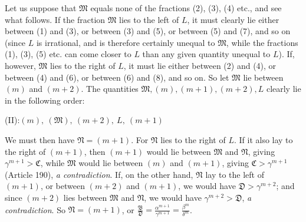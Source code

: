 Let us suppose that $\mathfrak{M}$ equals none of the fractions (2), (3), (4) etc., and see what follows. If the fraction $\mathfrak{M}$ lies to the left of $L$, it must clearly lie either between (1) and (3), or between (3) and (5), or between (5) and (7), and so on (since $L$ is irrational, and is therefore certainly unequal to $\mathfrak{M}$, while the fractions (1), (3), (5) etc. can come closer to $L$ than any given quantity unequal to $L$). If, however, $\mathfrak{M}$ lies to the right of $L$, it must lie either between (2) and (4), or between (4) and (6), or between (6) and (8), and so on. So let $\mathfrak{M}$ lie between
$(m)$ and $(m+2)$. The quantities $\mathfrak{M},(m),(m+1),(m+2),L$ clearly lie in the following order:
\begin{center}
(II):\qquad $(m),\ (\mathfrak{M}),\ (m+2),\ L,\ (m+1)$
\end{center}
We must then have $\mathfrak{N}=(m+1)$. For $\mathfrak{N}$ lies to the right of $L$. If it also lay to the right of $(m+1)$, then $(m+1)$ would lie between $\mathfrak{M}$ and $\mathfrak{N}$, giving $\gamma^{m+1}>\mathfrak{C}$, while $\mathfrak{M}$ would lie between $(m)$ and $(m+1)$, giving $\mathfrak{C}>\gamma^{m+1}$ (Article 190), \textit{a contradiction}. If, on the other hand, $\mathfrak{N}$ lay to the left of $(m+1)$, or between $(m+2)$ and $(m+1)$, we would have $\mathfrak{D}>\gamma^{m+2}$; and since $(m+2)$ lies between $\mathfrak{M}$ and $\mathfrak{N}$, we would have $\gamma^{m+2}>\mathfrak{D}$, \textit{a contradiction}. So $\mathfrak{N}=(m+1)$, or $\frac{\mathfrak{B}}{\mathfrak{D}}=\frac{\alpha^{m+1}}{\gamma^{m+1}}=\frac{\beta^m}{\delta^m}$.

